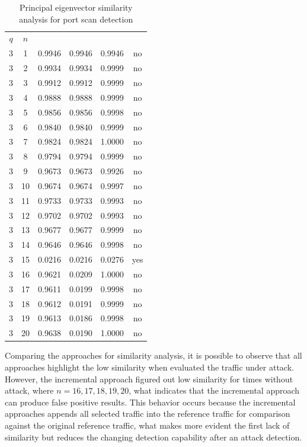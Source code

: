 \begin{table}[h!]
  \centering
  \footnotesize
  \caption{Principal eigenvector similarity analysis for port scan detection}
  \label{tab:2.05}
  \begin{tabular}{ c c c c c c }
	\toprule
	\multirow{2}{*}{\pmb{Time Frame} $q$} &\multirow{2}{*}{\pmb{Time} $n$}   &\multicolumn{3}{c}{\pmb{Similarity Analysis}} &\multirow{2}{*}{\pmb{Ground Truth}}\\ 
			\hhline{~~---~}
			& &\pmb{Incremental Individualized} &\pmb{Incremental} &\pmb{Individual}\\
	\midrule
	3 &1 &0.9946 &0.9946 &0.9946 &no \\
	3 &2 &0.9934 &0.9934 &0.9999 &no \\
	3 &3 &0.9912 &0.9912 &0.9999 &no \\
	3 &4 &0.9888 &0.9888 &0.9999 &no \\
	3 &5 &0.9856 &0.9856 &0.9998 &no \\
	3 &6 &0.9840 &0.9840 &0.9999 &no \\
	3 &7 &0.9824 &0.9824 &1.0000 &no \\
	3 &8 &0.9794 &0.9794 &0.9999 &no \\
	3 &9 &0.9673 &0.9673 &0.9926 &no \\
	3 &10 &0.9674 &0.9674 &0.9997 &no \\
	3 &11 &0.9733 &0.9733 &0.9993 &no \\
	3 &12 &0.9702 &0.9702 &0.9993 &no \\
	3 &13 &0.9677 &0.9677 &0.9999 &no \\
	3 &14 &0.9646 &0.9646 &0.9998 &no \\
	3 &15 &0.0216 &0.0216 &0.0276 &yes \\
	3 &16 &0.9621 &0.0209 &1.0000 &no \\
	3 &17 &0.9611 &0.0199 &0.9998 &no \\
	3 &18 &0.9612 &0.0191 &0.9999 &no \\
	3 &19 &0.9613 &0.0186 &0.9998 &no \\
	3 &20 &0.9638 &0.0190 &1.0000 &no \\
    \bottomrule
  \end{tabular}
\end{table}



Comparing the approaches for similarity analysis, it is possible to observe that all approaches highlight the low similarity when evaluated the traffic under attack. However, the incremental approach figured out low similarity for times without attack, where $n=16, 17, 18, 19, 20$, what indicates that the incremental approach can produce false positive results. This behavior occurs because the incremental approaches appends all selected traffic into the reference traffic for comparison against the original reference traffic, what makes more evident the first lack of similarity but reduces the changing detection capability after an attack detection.

